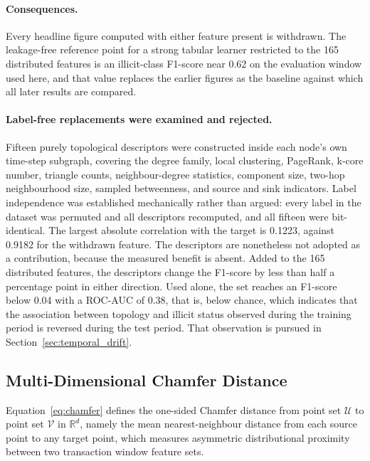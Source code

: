 \documentclass[12pt,a4paper]{article}
\begin{document}
\paragraph{Consequences.}
Every headline figure computed with either feature present is
withdrawn. The leakage-free reference point for a strong tabular
learner restricted to the 165 distributed features is an
illicit-class F1-score near 0.62 on the evaluation window used
here, and that value replaces the earlier figures as the baseline
against which all later results are compared.

\paragraph{Label-free replacements were examined and rejected.}
Fifteen purely topological descriptors were constructed inside
each node's own time-step subgraph, covering the degree family,
local clustering, PageRank, k-core number, triangle counts,
neighbour-degree statistics, component size, two-hop
neighbourhood size, sampled betweenness, and source and sink
indicators. Label independence was established mechanically
rather than argued: every label in the dataset was permuted and
all descriptors recomputed, and all fifteen were bit-identical.
The largest absolute correlation with the target is 0.1223,
against 0.9182 for the withdrawn feature. The descriptors are
nonetheless not adopted as a contribution, because the measured
benefit is absent. Added to the 165 distributed features, the
descriptors change the F1-score by less than half a percentage
point in either direction. Used alone, the set reaches an
F1-score below 0.04 with a
ROC-AUC of 0.38, that is, below chance, which indicates that the
association between topology and illicit status observed during
the training period is reversed during the test period. That
observation is pursued in Section~\ref{sec:temporal_drift}.


\subsection{Multi-Dimensional Chamfer Distance}
\label{sec:mdcd}

Equation~\eqref{eq:chamfer} defines the one-sided Chamfer
distance from point set $\mathcal{U}$ to point set
$\mathcal{V}$ in $\mathbb{R}^d$, namely the mean
nearest-neighbour distance from each source point to any
target point, which measures asymmetric distributional
proximity between two transaction window feature sets.
\end{document}
